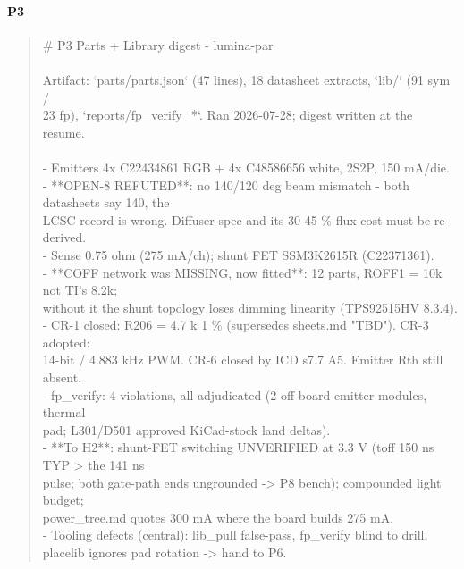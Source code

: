 \documentclass[11pt,a4paper]{article}
\begin{document}
\paragraph*{P3}
\begin{quote}\small\ttfamily\raggedright
\# P3 Parts + Library digest - lumina-par\\
~\\
Artifact: `parts/parts.json` (47 lines), 18 datasheet extracts, `lib/` (91 sym /\\
23 fp), `reports/fp\_verify\_{*}`. Ran 2026-07-28; digest written at the resume.\\
~\\
- Emitters 4x C22434861 RGB + 4x C48586656 white, 2S2P, 150 mA/die.\\
- {*}{*}OPEN-8 REFUTED{*}{*}: no 140/120 deg beam mismatch - both datasheets say 140, the\\
  LCSC record is wrong. Diffuser spec and its 30-45 \% flux cost must be re-derived.\\
- Sense 0.75 ohm (275 mA/ch); shunt FET SSM3K2615R (C22371361).\\
- {*}{*}COFF network was MISSING, now fitted{*}{*}: 12 parts, ROFF1 = 10k not TI's 8.2k;\\
  without it the shunt topology loses dimming linearity (TPS92515HV 8.3.4).\\
- CR-1 closed: R206 = 4.7 k 1 \% (supersedes sheets.md "TBD"). CR-3 adopted:\\
  14-bit / 4.883 kHz PWM. CR-6 closed by ICD s7.7 A5. Emitter Rth still absent.\\
- fp\_verify: 4 violations, all adjudicated (2 off-board emitter modules, thermal\\
  pad; L301/D501 approved KiCad-stock land deltas).\\
- {*}{*}To H2{*}{*}: shunt-FET switching UNVERIFIED at 3.3 V (toff 150 ns TYP \textgreater{} the 141 ns\\
  pulse; both gate-path ends ungrounded -\textgreater{} P8 bench); compounded light budget;\\
  power\_tree.md quotes 300 mA where the board builds 275 mA.\\
- Tooling defects (central): lib\_pull false-pass, fp\_verify blind to drill,\\
  placelib ignores pad rotation -\textgreater{} hand to P6.
\end{quote}
\end{document}
